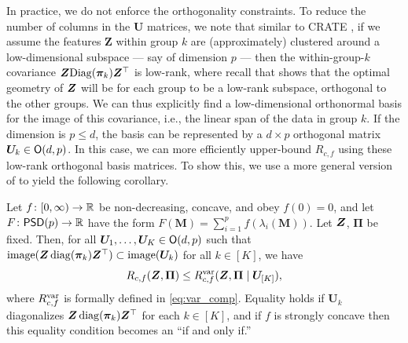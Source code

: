 \documentclass[../../book-main.tex]{subfiles}
\begin{document}
In practice, we do not enforce the orthogonality constraints. To reduce the number of columns in the $\bm U$ matrices, we note that similar to CRATE \citep{yu2023white}, if we assume the features $\bm Z$ within group \(k\) are (approximately) clustered around a low-dimensional subspace --- say of dimension \(p\) --- then the within-group-\(k\) covariance \(\bm{Z}\mathrm{Diag}(\bm \pi_{k})\bm{Z}^{\top}\) is low-rank, where recall that \cite{yu2020learning} shows that the optimal geometry of $\bm{Z}$ will be for each group to be a low-rank subspace, orthogonal to the other groups. We can thus explicitly find a low-dimensional orthonormal basis for the image of this covariance, i.e., the linear span of the data in group \(k\). If the dimension is $p \leq d$, the basis can be represented by a $d\times p$ orthogonal matrix $\bm U_k \in \mathsf{O}(d, p)$. In this case, we can more efficiently upper-bound \(R_{c,f}\) using these low-rank orthogonal basis matrices. To show this, we use a more general version of   to yield the following corollary.
\begin{corollary}\label{cor:var_concave_logdet}
    Let \(f \colon [0, \infty) \to \mathbb{R}\) be non-decreasing, concave, and obey \(f(0) = 0\), and let \(F \colon \mathsf{PSD}(p) \to \mathbb{R}\) have the form \(F(\bm M) = \sum_{i = 1}^{p}f(\lambda_{i}(\bm M))\). Let \(\bm{Z}\), \(\bm \Pi\) be fixed. Then, for all \(\bm U_{1}, \dots, \bm U_{K} \in \mathsf{O}(d, p)\) such that \(\mathrm{image}(\bm{Z}\operatorname{diag}(\bm \pi_{k})\bm{Z}^{\top}) \subset \mathrm{image}(\bm U_{k})\) for all \(k \in [K]\), we have
    \begin{equation}
        R_{c, f}(\bm{Z}, \bm\Pi) \leq R_{c, f}^{\rm var}(\bm{Z}, \bm\Pi \mid \bm U_{[K]}), 
    \end{equation}
     where \(R_{c, f}^{\rm var}\) is formally defined in \eqref{eq:var_comp}. Equality holds if \(\bm U_{k}\) diagonalizes \(\bm{Z}\operatorname{diag}(\bm \pi_{k})\bm{Z}^{\top}\) for each \(k \in [K]\), and if \(f\) is strongly concave then this equality condition becomes an ``if and only if.''
\end{corollary}
\end{document}
